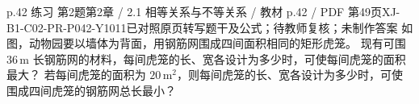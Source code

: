 \par\noindent\begin{minipage}{\linewidth}
\begin{bankitem}{p.42 练习 第2题}{第2章 / 2.1 相等关系与不等关系 / 教材 p.42 / PDF 第49页}{XJ-B1-C02-PR-P042-Y1011}{已对照原页转写题干及公式；待教师复核；未制作答案}
如图，动物园要以墙体为背面，用钢筋网围成四间面积相同的矩形虎笼。
现有可围 $36\,\mathrm m$ 长钢筋网的材料，每间虎笼的长、宽各设计为多少时，可使每间虎笼的面积最大？
若每间虎笼的面积为 $20\,\mathrm{m^2}$，则每间虎笼的长、宽各设计为多少时，可使围成四间虎笼的钢筋网总长最小？
\end{bankitem}
\end{minipage}\par\medskip
